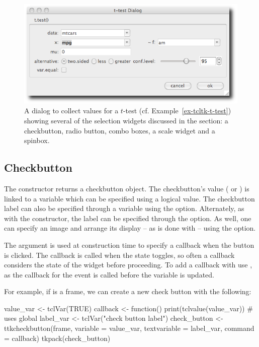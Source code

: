 \begin{figure}
  \centering
  \includegraphics[width=.75\textwidth]{fig-tcltk-t-test.png}
  \caption{A dialog to collect values for a $t$-test (cf.
    Example~\ref{ex-tcltk-t-test}) showing several of the selection
    widgets discussed in the section: a checkbutton, radio button,
    combo boxes, a scale widget and a spinbox.}
  \label{fig:fig-tcltk-t-test}
\end{figure}

\subsection{Checkbutton}
\label{sec:tcltk:checkboxes}

The  constructor returns a checkbutton
object. The checkbutton's value ( or ) is linked
to a \TCL\/ variable which can be specified using a logical value.
The checkbutton label can also be specified through a \TCL\/ variable
using the  option.  Alternately,
as with the  constructor, the label can be specified
through the  option. As well, one can
specify an image and arrange its display -- as is done with
 -- using the 
option.

The  argument is used at construction
time to specify a callback when the button is clicked. The callback is
called when the state toggles, so often a callback considers the state
of the widget before proceeding.  To add a callback with
 use , as the callback
for the event  is called before the variable is
updated.

For example, if  is a frame, we can create a new check button
with the following:

\begin{Schunk}
\begin{Sinput}
 value_var <- tclVar(TRUE)
 callback <- function() print(tclvalue(value_var)) # uses global
 label_var <- tclVar("check button label")
 check_button <- 
   ttkcheckbutton(frame, variable = value_var, 
                  textvariable = label_var, command = callback)
 tkpack(check_button)
\end{Sinput}
\end{Schunk}


